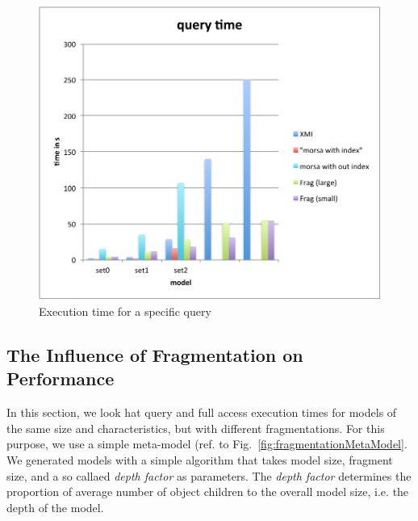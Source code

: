 
\begin{figure}
  \centering
  \includegraphics[width=0.65\linewidth]{figures/grabatsQuery}
  \caption{Execution time for a specific query}
  \label{fig:grabatsQuery}
\end{figure}

\subsection{The Influence of Fragmentation on Performance}

In this section, we look hat query and full access execution times for models of the same size and characteristics, but with different fragmentations. For this purpose, we use a simple meta-model (ref. to Fig.~\ref{fig:fragmentationMetaModel}. We generated models with a simple algorithm that takes model size, fragment size, and a so callaed \emph{depth factor} as parameters. The \emph{depth factor} determines the proportion of average number of object children to the overall model size, i.e. the depth of the model. 

